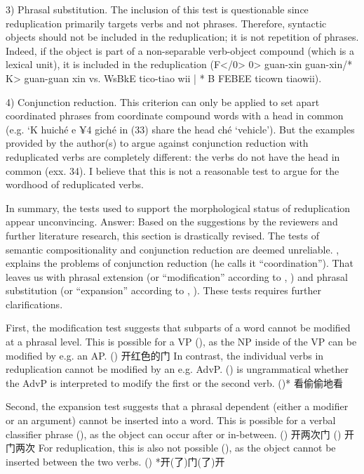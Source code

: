 \documentclass[fleqn,twoside]{article}
\begin{document}
{3) Phrasal substitution. The inclusion of this test is questionable since reduplication primarily targets verbs and not phrases. Therefore, syntactic objects should not be included in the reduplication; it is not repetition of phrases. Indeed, if the object is part of a non-separable verb-object compound (which is a lexical unit), it is included in the reduplication (F</0> 0> guan-xin guan-xin/*  K> guan-guan xin vs. WsBkE tico-tiao wii | * B FEBEE ticown tiaowii).

4) Conjunction reduction. This criterion can only be applied to set apart coordinated phrases from coordinate compound words with a head in common (e.g. ‘K huiché e ¥4 giché in (33) share the head  ché ‘vehicle’). But the examples provided by the author(s) to argue against conjunction reduction with reduplicated verbs are completely different: the verbs do not have the head in common (exx. 34). I believe that this is not a reasonable test to argue for the wordhood of reduplicated verbs.

In summary, the tests used to support the morphological status of reduplication appear
unconvincing. 
Answer:
Based on the suggestions by the reviewers and further literature research, this section is drastically revised.
The tests of semantic compositionality and conjunction reduction are deemed unreliable.
\citet[37--38]{Dai1992}, \citeyear[120--122]{Dai1998} explains the problems of conjunction reduction (he calls it ``coordination'').
That leaves us with phrasal extension (or ``modification'' according to \citealt[32]{Dai1992}, \citeyear[117]{Dai1998}) 
and phrasal substitution (or ``expansion'' according to \citealt[33]{Dai1992}, \citeyear[117--120]{Dai1998}).
These tests requires further clarifications.

First, the modification test suggests that subparts of a word cannot be modified at a phrasal level.
This is possible for a VP (), as the NP inside of the VP can be modified by e.g. an AP.
() 开红色的门
In contrast, the individual verbs in reduplication cannot be modified by an e.g. AdvP.
() is ungrammatical whether the AdvP is interpreted to modify the first or the second verb.
()* 看偷偷地看

Second, the expansion test suggests that a phrasal dependent (either a modifier or an argument) cannot be inserted into a word.
This is possible for a verbal classifier phrase (), as the object can occur after or in-between.
() 开两次门
() 开门两次
For reduplication, this is also not possible (), as the object cannot be inserted between the two verbs.
() *开(了)门(了)开

}
\end{document}
